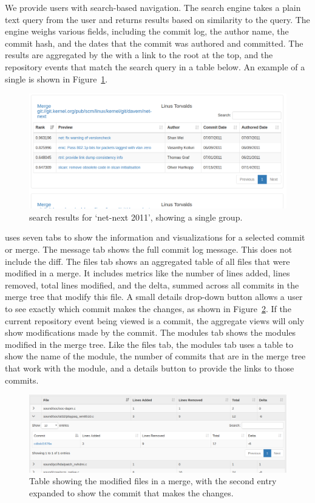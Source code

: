 \documentclass[draft]{IEEEtran}
\begin{document}
We provide users with search-based navigation. The search engine takes a
plain text query from the user and returns results based on similarity
to the query. The engine weighs various fields, including the commit
log, the author name, the commit hash, and the dates that the commit was
authored and committed. The results are aggregated by the \mt
with a link to the root at the top, and the repository events that match
the search query in a table below.  An example of a single \mt is shown
in Figure~\ref{fig:linvis_search_results}.

\begin{figure}[htpb]
  \centering
  \includegraphics[width=1.0\linewidth]{figures/linvis/search_results.png}
  \caption{\tool search results for `net-next 2011', showing a single
    \mt group.}
  \label{fig:linvis_search_results}
\end{figure}

\tool uses seven tabs to show the information and visualizations for a
selected commit or merge. The message tab shows the full commit log
message. This does not include the diff. The files tab shows an
aggregated table of all files that were modified in a merge. It includes
metrics like the number of lines added, lines removed, total lines
modified, and the delta, summed across all commits in the merge tree
that modify this file. A small details drop-down button allows a user to
see exactly which commit makes the changes, as shown in
Figure~\ref{fig:linvis_files}. If the current repository event being
viewed is a commit, the aggregate views will only show modifications
made by the commit. The modules tab shows the modules modified in the
merge tree. Like the files tab, the modules tab uses a table to show the
name of the module, the number of commits that are in the merge tree
that work with the module, and a details button to provide the links to
those commits.

\begin{figure}[htpb]
  \centering
  \includegraphics[width=1.0\linewidth]{figures/linvis/linvis_files.png}
  \caption{Table showing the modified files in a merge, with the second
  entry expanded to show the commit that makes the changes.}
  \label{fig:linvis_files}
\end{figure}
\end{document}
